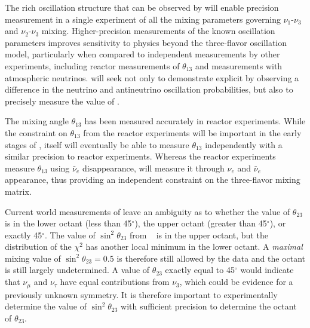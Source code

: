 The rich oscillation structure that can be observed by  will enable precision measurement  in a single experiment of all the mixing parameters governing $\nu_1$-$\nu_3$ and $\nu_2$-$\nu_3$ mixing. Higher-precision measurements of the known oscillation parameters improves sensitivity to physics beyond the three-flavor oscillation model, particularly when compared to independent measurements by other experiments, including reactor measurements of $\theta_{13}$ and
measurements with atmospheric neutrinos.  will seek not only to demonstrate explicit  by observing a difference in the neutrino and antineutrino oscillation probabilities, but also to precisely measure the value of \deltacp. 

 The mixing angle $\theta_{13}$ has been measured accurately in reactor experiments. While the constraint on $\theta_{13}$ from the reactor experiments will be important in the
early stages of , 
 itself will eventually be able to measure
$\theta_{13}$ independently with a similar precision to reactor experiments. 
Whereas the reactor experiments measure $\theta_{13}$ using $\bar{\nu}_e$ disappearance,  will measure it through $\nu_e$ and $\bar{\nu}_e$ appearance, thus providing an independent constraint on
the three-flavor mixing matrix.   

Current world measurements of  leave an ambiguity as to whether the value of $\theta_{23}$ is in the lower octant (less than 45\mbox{$^{\circ}$}), the upper octant (greater than 45\mbox{$^{\circ}$}), or exactly 45\mbox{$^{\circ}$}.  The value of $\sin^2 \theta_{23}$ from ~\cite{Esteban:2018azc,nufitweb} is in the upper octant, but the distribution of the $\chi^{2}$ has another local minimum in the lower octant. A \emph{maximal} mixing value of $\sin^2 \theta_{23} =0.5$ is therefore still allowed by the data and the octant is still largely undetermined.  A value of
$\theta_{23}$ exactly equal to 45\mbox{$^{\circ}$} would indicate that $\nu_{\mu}$ and $\nu_{\tau}$ have equal contributions from $\nu_3$, which could be evidence for a previously unknown symmetry.  It is therefore important to experimentally determine the value of $\sin ^2
\theta_{23}$ with sufficient precision to determine the octant of $\theta_{23}$.

